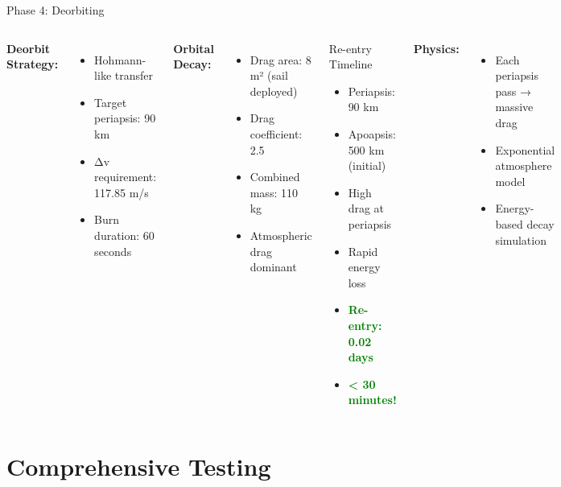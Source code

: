 \documentclass[aspectratio=169]{beamer}
\begin{document}
\begin{frame}{Phase 4: Deorbiting}
\begin{columns}
\textbf{Deorbit Strategy:}
\begin{itemize}
    \item Hohmann-like transfer
    \item Target periapsis: 90 km
    \item Δv requirement: 117.85 m/s
    \item Burn duration: 60 seconds
\end{itemize}

\vspace{1em}
\textbf{Orbital Decay:}
\begin{itemize}
    \item Drag area: 8 m² (sail deployed)
    \item Drag coefficient: 2.5
    \item Combined mass: 110 kg
    \item Atmospheric drag dominant
\end{itemize}

\begin{block}{Re-entry Timeline}
\begin{itemize}
    \item Periapsis: 90 km
    \item Apoapsis: 500 km (initial)
    \item High drag at periapsis
    \item Rapid energy loss
    \item \textcolor{green}{\textbf{Re-entry: 0.02 days}}
    \item \textcolor{green}{\textbf{< 30 minutes!}}
\end{itemize}
\end{block}

\vspace{0.5em}
\textbf{Physics:}
\begin{itemize}
    \item Each periapsis pass → massive drag
    \item Exponential atmosphere model
    \item Energy-based decay simulation
\end{itemize}
\end{columns}
\end{frame}

\section{Comprehensive Testing}
\end{document}
